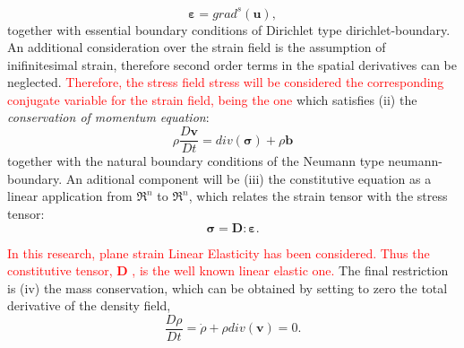 \documentclass[preprint,12pt,a4paper]{elsarticle}
\newcommand{\vect}[1]{
  \ensuremath{\mathbf{{#1}}}
}
\newcommand{\tens}[1]{
  \ensuremath{\mathbf{{#1}}}
}
\newcommand{\Div}[1]{
  \ensuremath{div({#1})}
}
\newcommand\GradS[1]{grad^s({#1})}
\newcommand{\PNA}[1]{
  \textcolor{red}{{#1}}
}
\begin{document}
\begin{equation}
  \label{eq:Compatibility-equation}
  \tens{\varepsilon} = \GradS{\vect{u}},
\end{equation}
together with essential boundary conditions of Dirichlet type \gls{dirichlet-boundary}. An additional consideration over the strain field is
the assumption of inifinitesimal strain, therefore second order terms
in the spatial derivatives can be neglected. \PNA{Therefore, the stress field \gls{stress} will be considered the corresponding conjugate variable for the strain field, being the one} which satisfies (ii) the \textit{conservation of
  momentum equation}:
\begin{equation}
  \label{eq:Balance-momentum}
\rho \frac{D\vect{v}}{Dt} = \Div{\tens{\sigma}} + \rho \vect{b}
\end{equation}
together with the natural boundary conditions of the Neumann type \gls{neumann-boundary}.  An aditional component will be (iii) the constitutive equation as a linear
application from $\Re^n$ to $\Re^n$, which relates the
strain tensor with the stress tensor:
\begin{equation}
  \label{eq:Constitutive-equation}
\tens{\sigma} = \tens{D} \colon \tens{\varepsilon}.
\end{equation}
\PNA{In this research, plane strain Linear Elasticity has been considered. Thus the constitutive tensor, \tens{D}, is the well known linear elastic one.} The final restriction is (iv) the mass conservation, which can be obtained by
setting to zero the total derivative of the density field,
\begin{equation}
  \label{eq:Rho-material-derivative}
  \frac{D \rho}{D t} = \dot{\rho} + \rho \Div{\vect{v}} = 0.
\end{equation}
\end{document}
